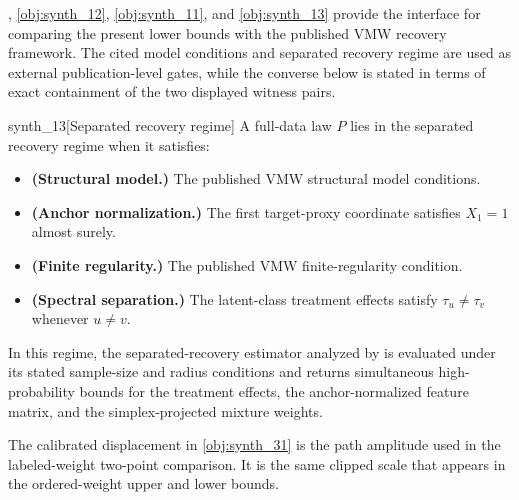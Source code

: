 , \cref{obj:synth_12}, \cref{obj:synth_11}, and \cref{obj:synth_13} provide the interface for comparing the present lower bounds with the published VMW recovery framework. The cited model conditions and separated recovery regime are used as external publication-level gates, while the converse below is stated in terms of exact containment of the two displayed witness pairs.

\begin{definitionv}{synth_13}[Separated recovery regime]
A full-data law \(P\) lies in the separated recovery regime when it satisfies:
\begin{itemize}
\item \textbf{(Structural model.)} The published VMW structural model conditions.
\item \textbf{(Anchor normalization.)} The first target-proxy coordinate satisfies \(X_1=1\) almost surely.
\item \textbf{(Finite regularity.)} The published VMW finite-regularity condition.
\item \textbf{(Spectral separation.)} The latent-class treatment effects satisfy \(\tau_u\ne\tau_v\) whenever \(u\ne v\).
\end{itemize}
In this regime, the separated-recovery estimator analyzed by \citet{VirkMazaheriWu2026} is evaluated under its stated sample-size and radius conditions and returns simultaneous high-probability bounds for the treatment effects, the anchor-normalized feature matrix, and the simplex-projected mixture weights.
\end{definitionv}

The calibrated displacement in \cref{obj:synth_31} is the path amplitude used in the labeled-weight two-point comparison. It is the same clipped scale that appears in the ordered-weight upper and lower bounds.

